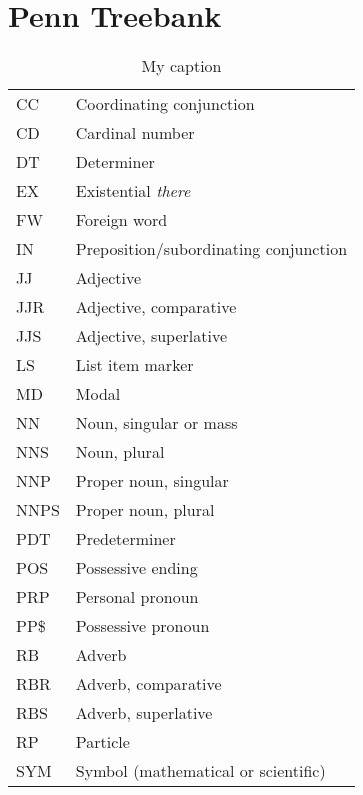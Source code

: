 
\chapter{Penn Treebank}
\label{app:penntreebank}

\begin{table}[!htbp]
\centering
\caption{My caption}
\label{my-label}
\begin{tabu}{ll}
CC   & Coordinating conjunction              \\
CD   & Cardinal number                       \\
DT   & Determiner                            \\
EX   & Existential \textit{there}            \\
FW   & Foreign word                          \\
IN   & Preposition/subordinating conjunction \\
JJ   & Adjective                             \\
JJR  & Adjective, comparative                \\
JJS  & Adjective, superlative                \\
LS   & List item marker                      \\
MD   & Modal                                 \\
NN   & Noun, singular or mass                \\
NNS  & Noun, plural                          \\
NNP  & Proper noun, singular                 \\
NNPS & Proper noun, plural                   \\
PDT  & Predeterminer                         \\
POS  & Possessive ending                     \\
PRP  & Personal pronoun                      \\
PP\$ & Possessive pronoun                    \\
RB   & Adverb                                \\
RBR  & Adverb, comparative                   \\
RBS  & Adverb, superlative                   \\
RP   & Particle                              \\
SYM  & Symbol (mathematical or scientific)   \\

\end{tabu}
\end{table}
